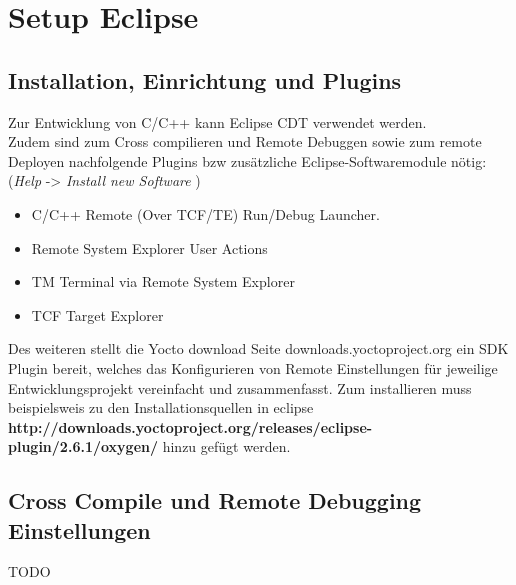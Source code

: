 \chapter{Setup Eclipse}%
\label{cha:setup_eclipse}

\section{Installation,  Einrichtung und Plugins}%
\label{sec:installation__einrichtung_plugins}

Zur Entwicklung von C/C++ kann Eclipse CDT verwendet werden. \\


Zudem sind zum Cross compilieren und Remote Debuggen sowie zum remote
Deployen nachfolgende Plugins bzw zusätzliche Eclipse-Softwaremodule nötig:
(\textit{Help} -> \textit{Install new Software} )

\begin{itemize}
    \item C/C++ Remote (Over TCF/TE) Run/Debug Launcher.
    \item Remote System Explorer User Actions
    \item TM Terminal via Remote System Explorer
    \item TCF Target Explorer
\end{itemize}

Des weiteren stellt die Yocto download Seite downloads.yoctoproject.org
ein SDK Plugin bereit, welches das Konfigurieren von Remote Einstellungen
für jeweilige Entwicklungsprojekt vereinfacht und zusammenfasst. Zum
installieren muss beispielsweis zu den Installationsquellen in eclipse
\textbf{http://downloads.yoctoproject.org/releases/eclipse-plugin/2.6.1/oxygen/}
hinzu gefügt werden.


\section{Cross Compile und Remote Debugging Einstellungen}%
\label{sec:cross_compile_und_remote_debugging_einstellungen}

TODO
